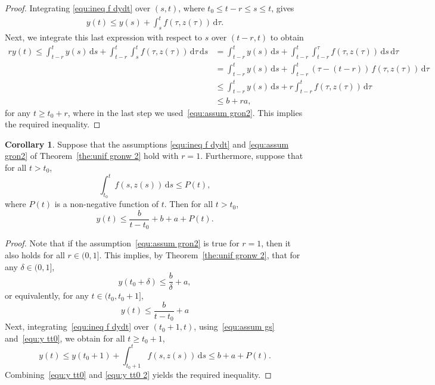 \documentclass[11pt, reqno]{amsart}
\theoremstyle{definition}
\newtheorem{corollary}[theorem]{Corollary}
\numberwithin{equation}{section}
\newcommand{\ds}{\mathrm{d}s}
\newcommand{\dtau}{\mathrm{d}\tau}
\begin{document}
\begin{proof}
Integrating \eqref{equ:ineq f dydt} over $(s,t)$, where $t_0\leq t-r\leq s\leq t$, gives
\begin{align*}
    y(t)\leq y(s) + \int_s^t f(\tau, z(\tau)) \,\dtau.
\end{align*}
Next, we integrate this last expression with respect to $s$ over $(t-r,t)$ to obtain
\begin{align*}
    r y(t) \leq \int_{t-r}^t y(s)\,\ds + \int_{t-r}^t \int_s^t f(\tau,z(\tau)) \,\dtau\,\ds
    &=
    \int_{t-r}^t y(s)\,\ds + \int_{t-r}^t \int_{t-r}^\tau f(\tau,z(\tau))\, \ds\,\dtau
    \\
    &=
    \int_{t-r}^t y(s)\,\ds + \int_{t-r}^t (\tau-(t-r))\, f(\tau, z(\tau))\,\dtau
    \\
    &\leq
    \int_{t-r}^t y(s)\,\ds + r \int_{t-r}^t f(\tau, z(\tau))\,\dtau
    \\
    &\leq
    b+ ra,
\end{align*}
for any $t\geq t_0+r$, where in the last step we used~\eqref{equ:assum gron2}. This implies the required inequality.
\end{proof}


\begin{corollary}\label{cor:unif gron}
Suppose that the assumptions \eqref{equ:ineq f dydt} and \eqref{equ:assum gron2} of Theorem~\ref{the:unif gronw 2} hold with $r=1$. Furthermore, suppose that for all $t> t_0$,
\begin{equation}\label{equ:assum gs}
    \int_{t_0}^t f(s,z(s))\, \ds \leq P(t),
\end{equation}
where $P(t)$ is a non-negative function of $t$. Then for all $t> t_0$,
\begin{equation*}
    y(t)\leq \frac{b}{t-t_0}+b+a  + P(t).
\end{equation*}
\end{corollary}


\begin{proof}
Note that if the assumption~\eqref{equ:assum gron2} is true for $r=1$, then it also holds for all $r\in (0,1]$.
This implies, by Theorem~\ref{the:unif gronw 2}, that for any $\delta\in (0,1]$,
\[
    y(t_0+\delta)\leq \frac{b}{\delta}+a,
\]
or equivalently, for any $t\in (t_0, t_0+1]$,
\begin{equation}\label{equ:y tt0}
    y(t) \leq \frac{b}{t-t_0}+a
\end{equation}
Next, integrating~\eqref{equ:ineq f dydt} over $(t_0+1,t)$, using~\eqref{equ:assum gs} and~\eqref{equ:y tt0}, we obtain for all $t\geq t_0+1$,
\begin{equation}\label{equ:y tt0 2}
    y(t)
    \leq y(t_0+1) + \int_{t_0+1}^t f(s,z(s))\, \ds
    \leq 
    b+a + P(t).
\end{equation}
Combining~\eqref{equ:y tt0} and \eqref{equ:y tt0 2} yields the required inequality.
\end{proof}
\end{document}
